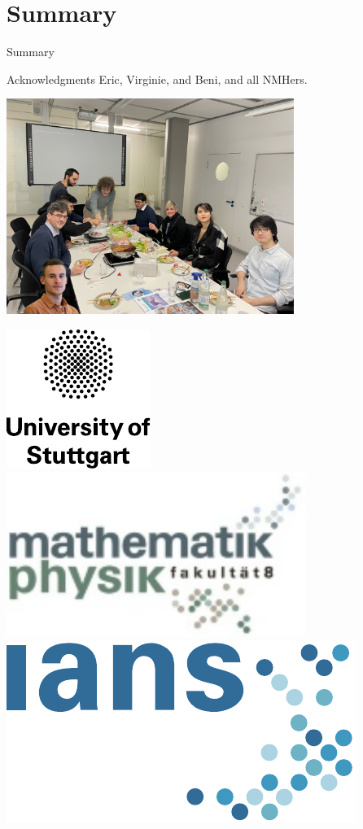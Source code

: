 \section{Summary}
\begin{frame}{Summary}
    
\end{frame}

\begin{frame}{Acknowledgments}
Eric, Virginie, and Beni, and all NMHers.
\begin{center}
    \includegraphics[width=0.7\textwidth]{nmh_all.png} 
\end{center}
\begin{center}
\includegraphics[scale=0.32]{tex-img/logo-start-inverted-en.pdf} 
~~
\includegraphics[scale=0.17]{tex-img/logo-faculty.pdf} 
~~
\includegraphics[scale=0.13]{tex-img/logo_institute.pdf}

\end{center}
\end{frame}
